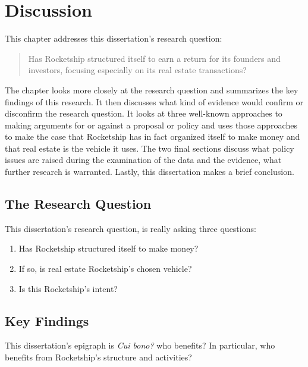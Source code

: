 
\chapter{Discussion}%
\label{ch:discussion}%
\noindent\bigskip%

This chapter addresses this dissertation's research question:
\medskip%
\begin{quote}\OnehalfSpacing
  Has Rocketship structured itself to earn a return for its founders and investors, focusing especially on its real estate transactions?
\end{quote}
The chapter looks more closely at the research question and summarizes the key findings of this research. It then discusses what kind of evidence would confirm or disconfirm the research question. It looks at three well-known approaches to making arguments for or against a proposal or policy and uses those approaches to make the case that Rocketship has in fact organized itself to make money and that real estate is the vehicle it uses. The two final sections discuss what policy issues are raised during the examination of the data and the evidence, what further research is warranted. Lastly, this dissertation makes a brief conclusion.

\section{The Research Question}%
\label{sec:research-question}\indent%

This dissertation's research question, is really asking three questions:
\begin{enumerate}
  \item Has Rocketship structured itself to make money?
  \item If so, is real estate Rocketship's chosen vehicle?
  \item Is this Rocketship's intent?
\end{enumerate}

\section{Key Findings}%
\label{sec:summary-key-findings}\indent%

This dissertation's epigraph is \textit{Cui bono?} who benefits? In particular, who benefits from Rocketship's structure and activities?

